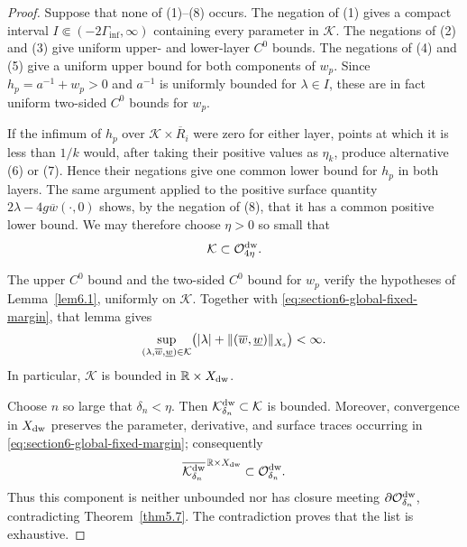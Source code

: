 \documentclass[11pt,reqno]{amsart}
\numberwithin{equation}{section}
\theoremstyle{definition}
\theoremstyle{remark}
\begin{document}
\begin{proof}
Suppose that none of \textup{(1)}--\textup{(8)} occurs.  The
negation of \textup{(1)} gives a compact interval
$I\Subset(-2\Gamma_{\inf},\infty)$ containing every parameter in
$\mathcal K$.  The negations of \textup{(2)} and \textup{(3)} give
uniform upper- and lower-layer $C^0$ bounds.  The negations of
\textup{(4)} and \textup{(5)} give a uniform upper bound for both
components of $w_p$.  Since $h_p=a^{-1}+w_p>0$ and $a^{-1}$ is
uniformly bounded for $\lambda\in I$, these are in fact uniform
two-sided $C^0$ bounds for $w_p$.

If the infimum of $h_p$ over $\mathcal K\times\overline R_i$ were
zero for either layer, points at which it is less than $1/k$ would,
after taking their positive values as $\eta_k$, produce
alternative \textup{(6)} or \textup{(7)}.  Hence their negations
give one common lower bound for $h_p$ in both layers.  The same
argument applied to the positive surface quantity
$2\lambda-4g\overline w(\cdot,0)$ shows, by the negation of
\textup{(8)}, that it has a common positive lower bound.  We may
therefore choose $\eta>0$ so small that
\begin{equation}\label{eq:section6-global-fixed-margin}
 \mathcal K\subset\mathcal O_{4\eta}^{\rm dw}.
\end{equation}

The upper $C^0$ bound and the two-sided $C^0$ bound for $w_p$ verify
the hypotheses of Lemma~\ref{lem6.1}, uniformly on $\mathcal K$.
Together with \eqref{eq:section6-global-fixed-margin}, that lemma
gives
\begin{equation}\label{eq:section6-global-Xdw-bound}
 \sup_{(\lambda,\overline w,\underline w)\in\mathcal K}
 \bigl(|\lambda|+
 \|(\overline w,\underline w)\|_{X_{\rm s}}\bigr)<\infty.
\end{equation}
In particular, $\mathcal K$ is bounded in
$\mathbb R\times X_{\rm dw}$.

Choose $n$ so large that $\delta_n<\eta$.  Then
$\mathcal K_{\delta_n}^{\rm dw}\subset\mathcal K$ is bounded.
Moreover, convergence in $X_{\rm dw}$ preserves the parameter,
derivative, and surface traces occurring in
\eqref{eq:section6-global-fixed-margin}; consequently
\[
 \overline{\mathcal K_{\delta_n}^{\rm dw}}
 ^{\,\mathbb R\times X_{\rm dw}}
 \subset\mathcal O_{\delta_n}^{\rm dw}.
\]
Thus this component is neither unbounded nor has closure meeting
$\partial\mathcal O_{\delta_n}^{\rm dw}$, contradicting
Theorem~\ref{thm5.7}.  The contradiction proves that the list is
exhaustive.
\end{proof}
\end{document}
